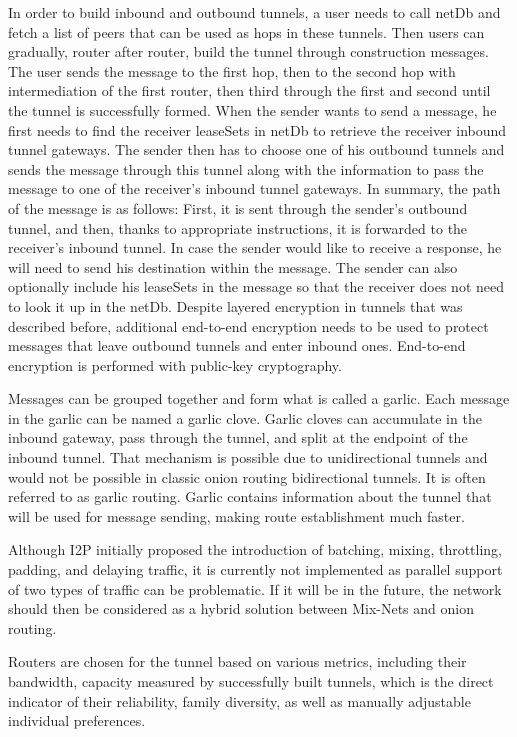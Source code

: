 In order to build inbound and outbound tunnels, a user needs to call netDb and fetch a list of peers that can be used as hops in these tunnels. Then users can gradually, router after router, build the tunnel through construction messages. The user sends the message to the first hop, then to the second hop with intermediation of the first router, then third through the first and second until the tunnel is successfully formed.
When the sender wants to send a message, he first needs to find the receiver leaseSets in netDb to retrieve the receiver inbound tunnel gateways. The sender then has to choose one of his outbound tunnels and sends the message through this tunnel along with the information to pass the message to one of the receiver’s inbound tunnel gateways. In summary, the path of the message is as follows: First, it is sent through the sender's outbound tunnel, and then, thanks to appropriate instructions, it is forwarded to the receiver's inbound tunnel.
In case the sender would like to receive a response, he will need to send his destination within the message. The sender can also optionally include his leaseSets in the message so that the receiver does not need to look it up in the netDb.
Despite layered encryption in tunnels that was described before, additional end-to-end encryption needs to be used to protect messages that leave outbound tunnels and enter inbound ones. End-to-end encryption is performed with public-key cryptography.

Messages can be grouped together and form what is called a garlic. Each message in the garlic can be named a garlic clove. Garlic cloves can accumulate in the inbound gateway, pass through the tunnel, and split at the endpoint of the inbound tunnel. That mechanism is possible due to unidirectional tunnels and would not be possible in classic onion routing bidirectional tunnels. It is often referred to as garlic routing.
Garlic contains information about the tunnel that will be used for message sending, making route establishment much faster.

Although I2P initially proposed the introduction of batching, mixing, throttling, padding, and delaying traffic, it is currently not implemented as parallel support of two types of traffic can be problematic. If it will be in the future, the network should then be considered as a hybrid solution between Mix-Nets and onion routing. 

Routers are chosen for the tunnel based on various metrics, including their bandwidth, capacity measured by successfully built tunnels, which is the direct indicator of their reliability, family diversity, as well as manually adjustable individual preferences.

